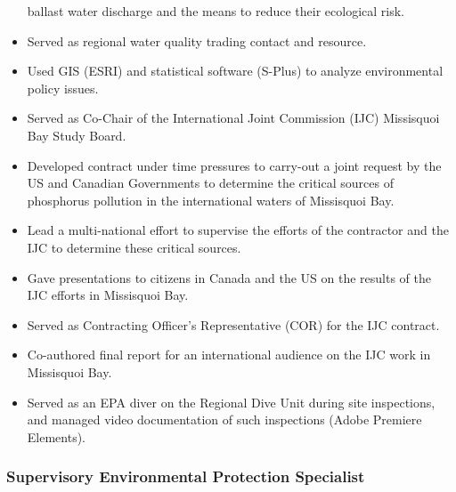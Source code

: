 \documentclass[12pt]{article}
\begin{document}
\begin{itemize}
  ballast water discharge and the means to reduce their ecological risk.
\item
  Served as regional water quality trading contact and resource.
\item
  Used GIS (ESRI) and statistical software (S-Plus) to analyze
  environmental policy issues.
\item
  Served as Co-Chair of the International Joint Commission (IJC)
  Missisquoi Bay Study Board.
\item
  Developed contract under time pressures to carry-out a joint request
  by the US and Canadian Governments to determine the critical sources
  of phosphorus pollution in the international waters of Missisquoi Bay.
\item
  Lead a multi-national effort to supervise the efforts of the
  contractor and the IJC to determine these critical sources.
\item
  Gave presentations to citizens in Canada and the US on the results of
  the IJC efforts in Missisquoi Bay.
\item
  Served as Contracting Officer's Representative (COR) for the IJC
  contract.
\item
  Co-authored final report for an international audience on the IJC work
  in Missisquoi Bay.
\item
  Served as an EPA diver on the Regional Dive Unit during site
  inspections, and managed video documentation of such inspections
  (Adobe Premiere Elements).
\end{itemize}

\subsubsection{Supervisory Environmental Protection Specialist}
\end{document}
